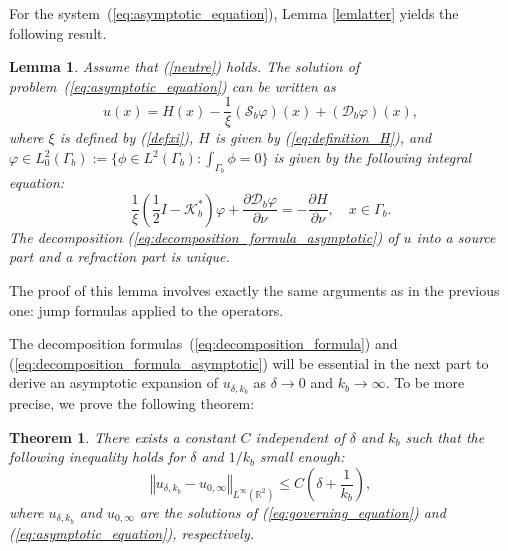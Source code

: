 \documentclass[final]{siamltex}
\numberwithin{equation}{section}
\numberwithin{figure}{section}
\numberwithin{table}{section}
\newtheorem{thm}{Theorem}
\newtheorem{lem}{Lemma}
\begin{document}
For the system~(\ref{eq:asymptotic_equation}), Lemma
\ref{lemlatter} yields the following result.
\begin{lem} \label{lem:decomposition_lemma_asymptotic} Assume that (\ref{neutre}) holds. The solution
of problem~(\ref{eq:asymptotic_equation}) can be written as
\begin{equation}
u(x)=H(x)-\frac{1}{\xi}(\mathcal{S}_{b}\varphi)(x)+(\mathcal{D}_{b}\varphi)(x),
\label{eq:decomposition_formula_asymptotic}
\end{equation}
 where $\xi$ is defined by (\ref{defxi}), $H$ is given by (\ref{eq:definition_H}), and $\varphi\in L_0^{2}(\Gamma_{b}):= \{\phi \in L^2(\Gamma_b): \int_{\Gamma_b}
 \phi =0\}$
is given by the following integral equation:
\begin{equation} \label{eq:decomposition_formula_asymptotic2}
\frac{1}{\xi}\left(\frac{1}{2}I-\mathcal{K}_{b}^{*}\right)\varphi
+\frac{\partial\mathcal{D}_{b}\varphi}{\partial\nu}=-\frac{\partial
H}{\partial\nu}, \quad x \in \Gamma_b.
\end{equation}
 The decomposition (\ref{eq:decomposition_formula_asymptotic}) of $u$ into a source part and a refraction part is unique.
\end{lem}
The proof of this lemma involves exactly the same arguments as in
the previous one: jump formulas applied to the operators.

The decomposition formulas~(\ref{eq:decomposition_formula}) and
(\ref{eq:decomposition_formula_asymptotic}) will be essential in
the next part to derive an asymptotic expansion of
$u_{\delta,k_{b}}$ as $\delta\rightarrow 0$ and $k_b\rightarrow
\infty$. To be more precise, we prove the following theorem:
\begin{thm} \label{thm:main-result}There exists a constant $C$
independent of $\delta$ and $k_{b}$ such that the following
inequality holds for $\delta$ and $1/k_{b}$ small enough:
\begin{equation}
\left\Vert u_{\delta,k_{b}}-u_{0,\infty}\right\Vert
_{L^{\infty}(\mathbb{R}^{2})}\leq
C\left(\delta+\frac{1}{k_{b}}\right),\label{eq:estimate-general}
\end{equation}
 where $u_{\delta,k_{b}}$ and $u_{0,\infty}$ are the solutions of (\ref{eq:governing_equation})
and (\ref{eq:asymptotic_equation}), respectively.
\end{thm}
\end{document}
